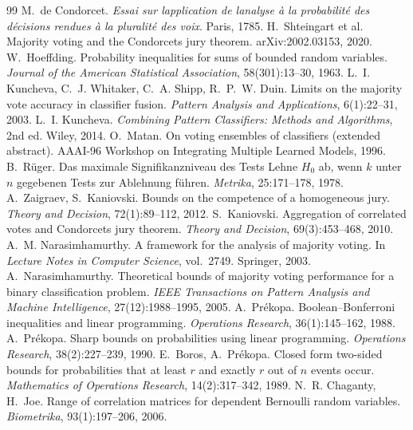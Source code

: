 \documentclass[11pt]{article}
\begin{document}
\begin{thebibliography}{99}\small
{} M.~de Condorcet. \emph{Essai sur l\apos application de l\apos analyse à la probabilité des décisions rendues à la pluralité des voix}. Paris, 1785.
 H.~Shteingart et al. Majority voting and the Condorcet\apos s jury theorem. arXiv:2002.03153, 2020.
 W.~Hoeffding. Probability inequalities for sums of bounded random variables. \emph{Journal of the American Statistical Association}, 58(301):13--30, 1963.
 L.~I. Kuncheva, C.~J. Whitaker, C.~A. Shipp, R.~P.~W. Duin. Limits on the majority vote accuracy in classifier fusion. \emph{Pattern Analysis and Applications}, 6(1):22--31, 2003.
 L.~I. Kuncheva. \emph{Combining Pattern Classifiers: Methods and Algorithms}, 2nd ed. Wiley, 2014.
 O.~Matan. On voting ensembles of classifiers (extended abstract). AAAI-96 Workshop on Integrating Multiple Learned Models, 1996.
 B.~Rüger. Das maximale Signifikanzniveau des Tests \gerlq Lehne $H_0$ ab, wenn $k$ unter $n$ gegebenen Tests zur Ablehnung führen\gerrq. \emph{Metrika}, 25:171--178, 1978.
 A.~Zaigraev, S.~Kaniovski. Bounds on the competence of a homogeneous jury. \emph{Theory and Decision}, 72(1):89--112, 2012.
 S.~Kaniovski. Aggregation of correlated votes and Condorcet\apos s jury theorem. \emph{Theory and Decision}, 69(3):453--468, 2010.
 A.~M. Narasimhamurthy. A framework for the analysis of majority voting. In \emph{Lecture Notes in Computer Science}, vol.~2749. Springer, 2003.
 A.~Narasimhamurthy. Theoretical bounds of majority voting performance for a binary classification problem. \emph{IEEE Transactions on Pattern Analysis and Machine Intelligence}, 27(12):1988--1995, 2005.
 A.~Prékopa. Boolean--Bonferroni inequalities and linear programming. \emph{Operations Research}, 36(1):145--162, 1988.
 A.~Prékopa. Sharp bounds on probabilities using linear programming. \emph{Operations Research}, 38(2):227--239, 1990.
 E.~Boros, A.~Prékopa. Closed form two-sided bounds for probabilities that at least $r$ and exactly $r$ out of $n$ events occur. \emph{Mathematics of Operations Research}, 14(2):317--342, 1989.
 N.~R. Chaganty, H.~Joe. Range of correlation matrices for dependent Bernoulli random variables. \emph{Biometrika}, 93(1):197--206, 2006.
\end{thebibliography}
\end{document}

